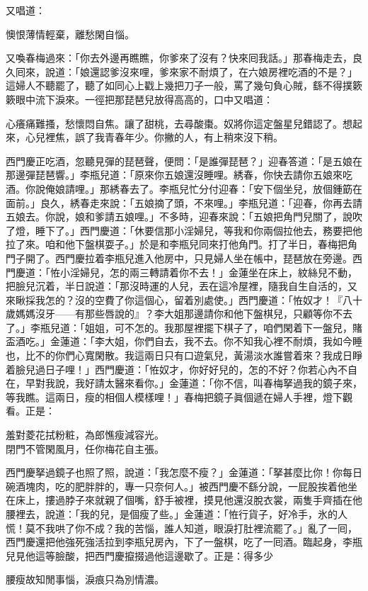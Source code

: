 又唱道：

\begin{myquote}
懊恨薄情輕棄，離愁閑自惱。
\end{myquote}

又喚春梅過來：「你去外邊再瞧瞧，你爹來了沒有？快來囘我話。」那春梅走去，良久囘來，說道：「娘還認爹沒來哩，爹來家不耐煩了，在六娘房裡吃酒的不是？」{}這婦人不聽罷了，聽了如同心上戳上幾把刀子一般，罵了幾句負心賊，繇不得撲簌簌眼中流下淚來。一徑把那琵琶兒放得高高的，口中又唱道：

\begin{myquote}
心癢痛難搔，愁懷悶自焦。讓了甜桃，去尋酸棗。奴將你這定盤星兒錯認了。想起來，心兒裡焦，誤了我青春年少。你撇的人，有上稍來沒下稍。
\end{myquote}

西門慶正吃酒，忽聽見彈的琵琶聲，便問：「是誰彈琵琶？」迎春答道：「是五娘在那邊彈琵琶響。」李瓶兒道：「原來你五娘還沒睡哩。綉春，你快去請你五娘來吃酒。你說俺娘請哩。」那綉春去了。李瓶兒忙分付迎春：「安下個坐兒，放個鍾筯在面前。」良久，綉春走來說：「五娘摘了頭，不來哩。」李瓶兒道：「迎春，你再去請五娘去。你說，娘和爹請五娘哩。」不多時，迎春來說：「五娘把角門兒關了，說吹了燈，睡下了。」西門慶道：「休要信那小淫婦兒，等我和你兩個拉他去，務要把他拉了來。咱和他下盤棋耍子。」於是和李瓶兒同來打他角門。打了半日，春梅把角門子開了。西門慶拉着李瓶兒進入他房中，只見婦人坐在帳中，琵琶放在旁邊。西門慶道：「恠小淫婦兒，怎的兩三轉請着你不去！」金蓮坐在床上，紋絲兒不動，把臉兒沉着，半日說道：「那沒時運的人兒，丟在這冷屋裡，隨我自生自活的，又來瞅採我怎的？沒的空費了你這個心，留着別處使。」{}西門慶道：「恠奴才！『八十歲媽媽沒牙——有那些唇說的』？李大姐那邊請你和他下盤棋兒，只顧等你不去了。」李瓶兒道：「姐姐，可不怎的。我那屋裡擺下棋子了，咱們閑着下一盤兒，賭盃酒吃。」金蓮道：「李大姐，你們自去，我不去。你不知我心裡不耐煩，我如今睡也，比不的你們心寬閑散。我這兩日只有口遊氣兒，黃湯淡水誰嘗着來？我成日睜着臉兒過日子哩！」{}西門慶道：「恠奴才，你好好兒的，怎的不好？你若心內不自在，早對我說，我好請太醫來看你。」金蓮道：「你不信，叫春梅拏過我的鏡子來，等我瞧。這兩日，瘦的相個人模樣哩！」春梅把鏡子眞個遞在婦人手裡，燈下觀看。正是：

\begin{myquote}
羞對菱花拭粉粧，為郎憔瘦減容光。\\閉門不管閑風月，任你梅花自主張。
\end{myquote}

西門慶拏過鏡子也照了照，說道：「我怎麼不瘦？」金蓮道：「拏甚麼比你！你每日碗酒塊肉，吃的肥胖胖的，專一只奈何人。」被西門慶不繇分說，一屁股挨着他坐在床上，摟過脖子來就親了個嘴，舒手被裡，摸見他還沒脫衣裳，兩隻手齊插在他腰裡去，說道：「我的兒，是個瘦了些。」金蓮道：「恠行貨子，好冷手，氷的人慌！莫不我哄了你不成？我的苦惱，誰人知道，眼淚打肚裡流罷了。」亂了一囘，西門慶還把他強死強活拉到李瓶兒房內，下了一盤棋，吃了一囘酒。臨起身，李瓶兒見他這等臉酸，把西門慶攛掇過他這邊歇了。正是：得多少

\begin{myquote}
腰瘦故知閒事惱，淚痕只為別情濃。
\end{myquote}

